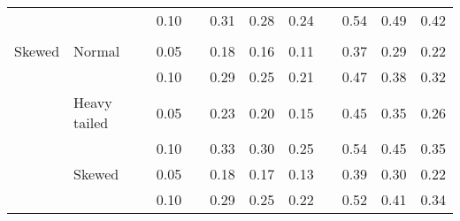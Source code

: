 \begin{table}[ht]
\begin{scriptsize}
\begin{center}
\begin{tabular}{ll p{.1cm} c p{.1cm} rrr p{.1cm} rrr}
             &              && 0.10 &&  0.31 & 0.28 & 0.24 && 0.54 & 0.49 & 0.42 \\ 
             &&&&&&&&&&&\\
Skewed       & Normal       && 0.05 &&  0.18 & 0.16 & 0.11 && 0.37 & 0.29 & 0.22 \\ 
             &              && 0.10 &&  0.29 & 0.25 & 0.21 && 0.47 & 0.38 & 0.32 \\ 
             & Heavy tailed && 0.05 &&  0.23 & 0.20 & 0.15 && 0.45 & 0.35 & 0.26 \\ 
             &              && 0.10 &&  0.33 & 0.30 & 0.25 && 0.54 & 0.45 & 0.35 \\ 
             & Skewed       && 0.05 &&  0.18 & 0.17 & 0.13 && 0.39 & 0.30 & 0.22 \\ 
             &              && 0.10 &&  0.29 & 0.25 & 0.22 && 0.52 & 0.41 & 0.34 \\ 


\hline
\end{tabular}
\end{center}
\end{scriptsize}
\end{table}

